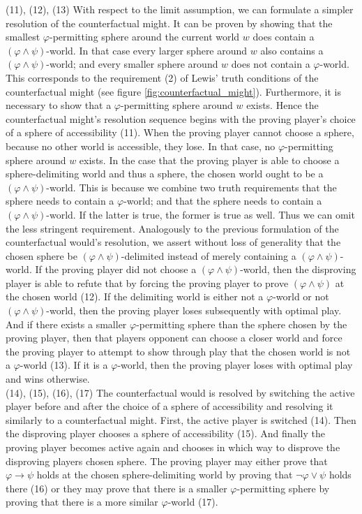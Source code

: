 \documentclass[a4paper,american,10pt]{paper}
\theoremstyle{definition}\newtheorem{definition}{Definition}
\begin{document}
\indent (11), (12), (13) With respect to the limit assumption, we can formulate a simpler resolution of the counterfactual might. It can be proven by showing that the smallest $\varphi$-permitting sphere around the current world $w$ does contain a $(\varphi\wedge\psi )$-world. In that case every larger sphere around $w$ also contains a $(\varphi\wedge\psi )$-world; and every smaller sphere around $w$ does not contain a $\varphi$-world. This corresponds to the requirement (2) of Lewis' truth conditions of the counterfactual might (see figure \ref{fig:counterfactual_might}). Furthermore, it is necessary to show that a $\varphi$-permitting sphere around $w$ exists. Hence the counterfactual might's resolution sequence begins with the proving player's choice of a sphere of accessibility (11). When the proving player cannot choose a sphere, because no other world is accessible, they lose. In that case, no $\varphi$-permitting sphere around $w$ exists. In the case that the proving player is able to choose a sphere-delimiting world and thus a sphere, the chosen world ought to be a $(\varphi\wedge\psi )$-world. This is because we combine two truth requirements that the sphere needs to contain a $\varphi$-world; and that the sphere needs to contain a $(\varphi\wedge\psi )$-world. If the latter is true, the former is true as well. Thus we can omit the less stringent requirement. Analogously to the previous formulation of the counterfactual would's resolution, we assert without loss of generality that the chosen sphere be $(\varphi\wedge\psi )$-delimited instead of merely containing a $(\varphi\wedge\psi )$-world. If the proving player did not choose a $(\varphi\wedge\psi )$-world, then the disproving player is able to refute that by forcing the proving player to prove $(\varphi\wedge\psi )$ at the chosen world (12). If the delimiting world is either not a $\varphi$-world or not $(\varphi\wedge\psi )$-world, then the proving player loses subsequently with optimal play. And if there exists a smaller $\varphi$-permitting sphere than the sphere chosen by the proving player, then that players opponent can choose a closer world and force the proving player to attempt to show through play that the chosen world is not a $\varphi$-world (13). If it is a $\varphi$-world, then the proving player loses with optimal play and wins otherwise.\\
\indent (14), (15), (16), (17) The counterfactual would is resolved by switching the active player before and after the choice of a sphere of accessibility and resolving it similarly to a counterfactual might. First, the active player is switched (14). Then the disproving player chooses a sphere of accessibility (15). And finally the proving player becomes active again and chooses in which way to disprove the disproving players chosen sphere. The proving player may either prove that $\varphi\rightarrow\psi$ holds at the chosen sphere-delimiting world by proving that $\neg\varphi\vee\psi$ holds there (16) or they may prove that there is a smaller $\varphi$-permitting sphere by proving that there is a more similar $\varphi$-world (17).
\end{document}
